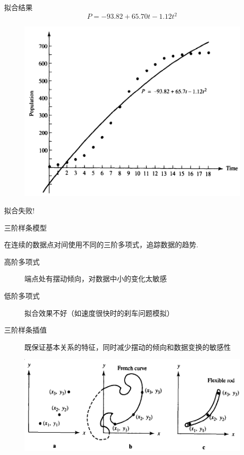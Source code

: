 \documentclass[UTF8]{ctexbeamer}
\begin{document}
\begin{frame}{拟合结果}
  \[
  P = -93.82 + 65.70t -1.12t^2
  \]

  \begin{figure}
    \centering{}
    \includegraphics[height=.55\textheight{}]{yeast-fig.png}
  \end{figure}
  拟合失败!
  
\end{frame}

\begin{frame}{三阶样条模型}

  在连续的数据点对间使用不同的三阶多项式，追踪数据的趋势.

  \begin{description}
  \item[高阶多项式] 端点处有摆动倾向，对数据中小的变化太敏感
  \item[低阶多项式] 拟合效果不好（如速度很快时的刹车问题模拟）
  \item[三阶样条插值] 既保证基本关系的特征，同时减少摆动的倾向和数据变换的敏感性
  \end{description}
  \begin{figure}
    \centering{}
    \includegraphics[width=.7\textwidth{}]{spline.png}
  \end{figure}
  
\end{frame}
\end{document}
